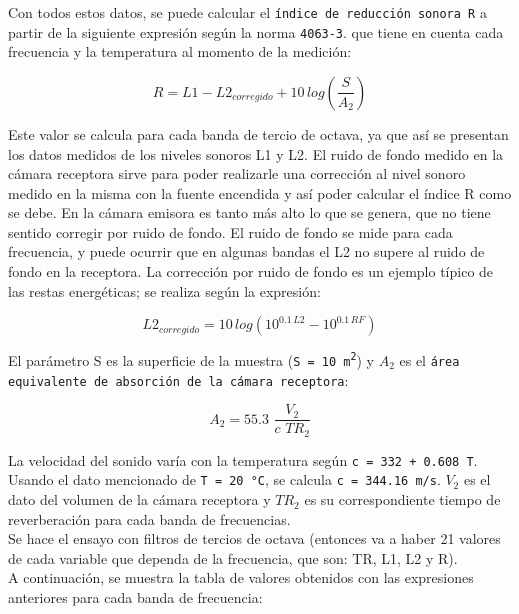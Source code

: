 		Con todos estos datos, se puede calcular el \texttt{índice de reducción sonora R} a partir de la siguiente expresión según la norma \texttt{4063-3}. que tiene en cuenta cada frecuencia y la temperatura al momento de la medición:
	
	\begin{equation}
		R = L1 - L2_{corregido} + 10\,log(\frac{S}{A_2})
	\end{equation}
	
	Este valor se calcula para cada banda de tercio de octava, ya que así se presentan los datos medidos de los niveles sonoros L1 y L2. El ruido de fondo medido en la cámara receptora sirve para poder realizarle una corrección al nivel sonoro medido en la misma con la fuente encendida y así poder calcular el índice R como se debe. En la cámara emisora es tanto más alto lo que se genera, que no tiene sentido corregir por ruido de fondo. El ruido de fondo se mide para cada frecuencia, y puede ocurrir que en algunas bandas el L2 no supere al ruido de fondo en la receptora. La corrección por ruido de fondo es un ejemplo típico de las restas energéticas; se realiza según la expresión:
	
	\begin{equation}
		L2_{corregido} = 10\,log(10^{0.1\,L2} - 10^{0.1\,RF})
	\end{equation}
	
	El parámetro S es la superficie de la muestra (\texttt{S = \SI{10}{\square\meter}}) y $A_2$ es el \texttt{área equivalente de absorción de la cámara receptora}:  
	
	\begin{equation}
		A_2 = 55.3\,\,\frac{V_2}{c\,\,TR_2}
	\end{equation}
	
	La velocidad del sonido varía con la temperatura según \texttt{c = 332 + 0.608\,T}. Usando el dato mencionado de \texttt{T = \SI{20}{\celsius}}, se calcula \texttt{c = \SI{344.16}{\meter/\second}}. \texttt{$V_2$} es el dato del volumen de la cámara receptora y \texttt{$TR_2$} es su correspondiente tiempo de reverberación para cada banda de frecuencias.\\

	Se hace el ensayo con filtros de tercios de octava (entonces va a haber 21 valores de cada variable que dependa de la frecuencia, que son: TR, L1, L2 y R).\\
	
	A continuación, se muestra la tabla de valores obtenidos con las expresiones anteriores para cada banda de frecuencia:
	
